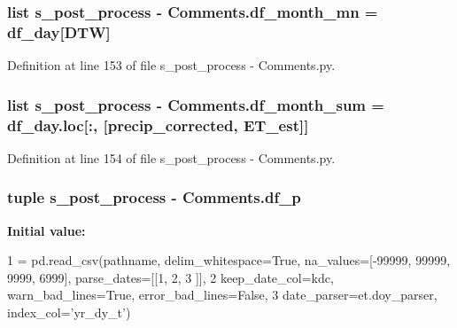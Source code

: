 \hypertarget{namespaces__post__process_01-_01_comments_a7e79dd26fcae372621057462f779d8cc}{}
\subsubsection[{df\+\_\+month\+\_\+mn}]{\setlength{\rightskip}{0pt plus 5cm}list s\+\_\+post\+\_\+process -\/ Comments.\+df\+\_\+month\+\_\+mn = {\bf df\+\_\+day}\mbox{[}\textquotesingle{}D\+T\+W\textquotesingle{}\mbox{]}}\label{namespaces__post__process_01-_01_comments_a7e79dd26fcae372621057462f779d8cc}


Definition at line 153 of file s\+\_\+post\+\_\+process -\/ Comments.\+py.

\hypertarget{namespaces__post__process_01-_01_comments_a6b3103e90669e297e65f84e9223e0d02}{}
\subsubsection[{df\+\_\+month\+\_\+sum}]{\setlength{\rightskip}{0pt plus 5cm}list s\+\_\+post\+\_\+process -\/ Comments.\+df\+\_\+month\+\_\+sum = df\+\_\+day.\+loc\mbox{[}\+:, \mbox{[}\textquotesingle{}precip\+\_\+corrected\textquotesingle{}, \textquotesingle{}E\+T\+\_\+est\textquotesingle{}\mbox{]}\mbox{]}}\label{namespaces__post__process_01-_01_comments_a6b3103e90669e297e65f84e9223e0d02}


Definition at line 154 of file s\+\_\+post\+\_\+process -\/ Comments.\+py.

\hypertarget{namespaces__post__process_01-_01_comments_a043c82fbb0106ffd9805f3c107892cf5}{}
\subsubsection[{df\+\_\+p}]{\setlength{\rightskip}{0pt plus 5cm}tuple s\+\_\+post\+\_\+process -\/ Comments.\+df\+\_\+p}\label{namespaces__post__process_01-_01_comments_a043c82fbb0106ffd9805f3c107892cf5}
{\bfseries Initial value\+:}
\begin{DoxyCode}
1 = pd.read\_csv(pathname, delim\_whitespace=\textcolor{keyword}{True}, na\_values=[-99999, 99999, 9999, 6999], parse\_dates=[[1, 2, 3
      ]],
2                        keep\_date\_col=kdc, warn\_bad\_lines=\textcolor{keyword}{True}, error\_bad\_lines=\textcolor{keyword}{False},
3                        date\_parser=et.doy\_parser, index\_col=\textcolor{stringliteral}{'yr\_dy\_t'})
\end{DoxyCode}



